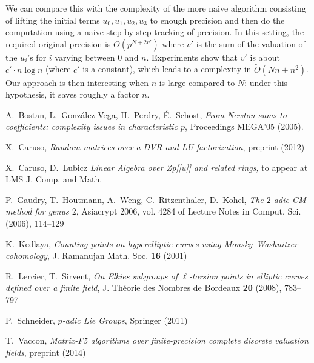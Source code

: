 \documentclass{amsart}
\begin{document}
We can compare this with the complexity of the more naive algorithm 
consisting of lifting the initial terms $u_0, u_1, u_2, u_3$ to enough 
precision and then do the computation using a naive step-by-step 
tracking of precision. In this setting, the required original precision 
is $O(p^{N+2v'})$ where $v'$ is the sum of the valuation of the $u_i$'s 
for $i$ varying between $0$ and $n$. Experiments show that $v'$ is about 
$c' \cdot n \log n$ (where $c'$ is a constant), which leads to a 
complexity in $\tilde O (N n + n^2)$. Our approach is then interesting
when $n$ is large compared to $N$: under this hypothesis, it saves
roughly a factor $n$.


\begin{thebibliography}{10}

  A.~Bostan, L.~Gonz\'alez-Vega, H.~Perdry, \'E.~Schost,
  \emph{From Newton sums to coefficients: complexity issues in characteristic $p$},
  Proceedings MEGA'05 (2005).

  X.~Caruso,
  \emph{Random matrices over a DVR and LU factorization},
  preprint (2012)
  
  X.~Caruso, D.~Lubicz
  \emph{Linear Algebra over Zp[[u]] and related rings,} 
  to appear at LMS J. Comp. and Math. 

  P.~Gaudry, T.~Houtmann, A.~Weng, C.~Ritzenthaler, D.~Kohel,
  \emph{The $2$-adic CM method for genus $2$}, 
  Asiacrypt 2006, vol. 4284 of Lecture Notes in Comput. Sci. (2006), 114--129

  K.~Kedlaya,
  \emph{Counting points on hyperelliptic curves using Monsky--Washnitzer cohomology}, 
  J. Ramanujan Math. Soc. {\bf 16} (2001)

  R.~Lercier, T.~Sirvent,
  \emph{On Elkies subgroups of $\ell$-torsion points in elliptic curves defined over a finite field},
  J. Th\'eorie des Nombres de Bordeaux {\bf 20} (2008), 783--797

  P.~Schneider,
  \emph{$p$-adic Lie Groups}, Springer (2011)

  T.~Vaccon,
  \emph{Matrix-F5 algorithms over finite-precision complete discrete 
  valuation fields},
  preprint (2014)
\end{thebibliography}
\end{document}
